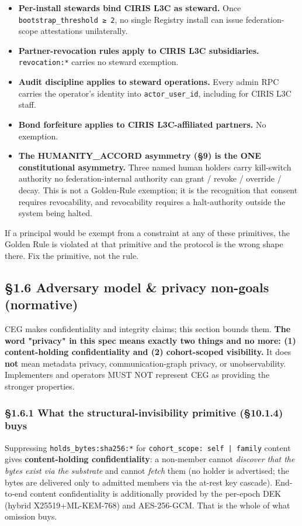 \documentclass[11pt]{article}
\begin{document}
\begin{itemize}\setlength\itemsep{0pt}
\item \textbf{Per-install stewards bind CIRIS L3C as steward.} Once \texttt{bootstrap\_threshold ≥ 2}, no single Registry install can issue federation-scope attestations unilaterally.
\item \textbf{Partner-revocation rules apply to CIRIS L3C subsidiaries.} \texttt{revocation:*} carries no steward exemption.
\item \textbf{Audit discipline applies to steward operations.} Every admin RPC carries the operator's identity into \texttt{actor\_user\_id}, including for CIRIS L3C staff.
\item \textbf{Bond forfeiture applies to CIRIS L3C-affiliated partners.} No exemption.
\item \textbf{The HUMANITY\_ACCORD asymmetry (§9) is the ONE constitutional asymmetry.} Three named human holders carry kill-switch authority no federation-internal authority can grant / revoke / override / decay. This is not a Golden-Rule exemption; it is the recognition that consent requires revocability, and revocability requires a halt-authority outside the system being halted.
\end{itemize}


If a principal would be exempt from a constraint at any of these primitives, the Golden Rule is violated at that primitive and the protocol is the wrong shape there. Fix the primitive, not the rule.


\subsection*{§1.6 Adversary model \& privacy non-goals (normative)}


CEG makes confidentiality and integrity claims; this section bounds them. \textbf{The word "privacy" in this spec means exactly two things and no more: (1) content-holding confidentiality and (2) cohort-scoped visibility.} It does \textbf{not} mean metadata privacy, communication-graph privacy, or unobservability. Implementers and operators MUST NOT represent CEG as providing the stronger properties.


\subsubsection*{§1.6.1 What the structural-invisibility primitive (§10.1.4) buys}

Suppressing \texttt{holds\_bytes:sha256:*} for \texttt{cohort\_scope: self | family} content gives \textbf{content-holding confidentiality}: a non-member cannot \textit{discover that the bytes exist via the substrate} and cannot \textit{fetch} them (no holder is advertised; the bytes are delivered only to admitted members via the at-rest key cascade). End-to-end content confidentiality is additionally provided by the per-epoch DEK (hybrid X25519+ML-KEM-768) and AES-256-GCM. That is the whole of what omission buys.
\end{document}

